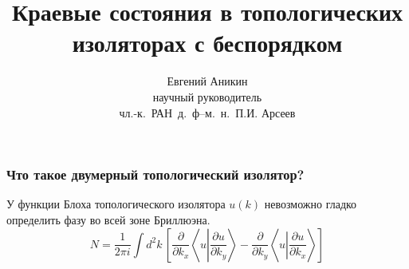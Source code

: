 \documentclass{beamer}
\title[Краевые состояния в топ. изоляторах]{Краевые состояния в топологических изоляторах с беспорядком}
\author[Е. Аникин]{Евгений Аникин \\
	научный руководитель\\
	чл.-к.~РАН~д.~ф--м.~н.~П.И. Арсеев}
\institute{ФИАН им. Лебедева}
\date{}
\begin{document}
\begin{frame}
    \titlepage
\end{frame}

\begin{frame}
    \frametitle{Что такое двумерный топологический изолятор?}
    У функции Блоха топологического изолятора $u(k)$ 
    невозможно гладко определить фазу во всей зоне Бриллюэна.
    \begin{equation}
        \label{TKNN}
        N = \frac{1}{2\pi i} 
            \int d^2 k\, \left[
                        \frac{\partial}{\partial k_x} \left\langle u \left| 
                        \frac{\partial u}{\partial k_y} \right.\right\rangle -
                        \frac{\partial}{\partial k_y} \left\langle u \left| 
                        \frac{\partial u}{\partial k_x} \right.\right\rangle 
                         \right]
    \end{equation}
\end{frame}
\end{document}
